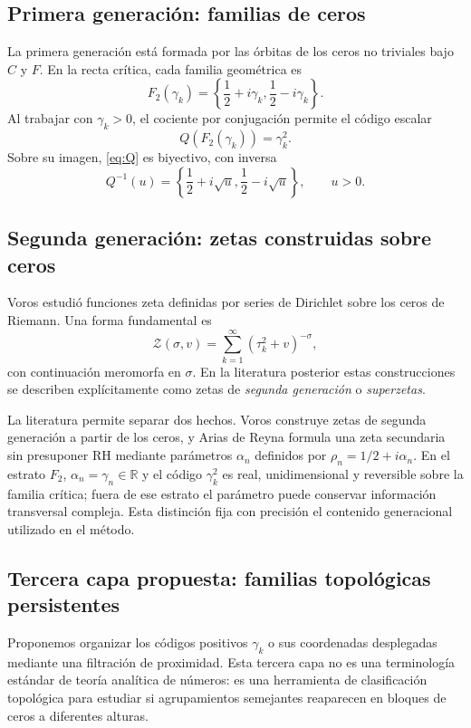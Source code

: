 \documentclass[11pt]{amsart}
\theoremstyle{definition}
\theoremstyle{remark}
\begin{document}
\subsection{Primera generación: familias de ceros}
La primera generación está formada por las órbitas de los ceros no triviales bajo $C$ y $F$. En la recta crítica, cada familia geométrica es
\begin{equation}
  F_2(\gamma_k)=\left\{\frac12+i\gamma_k,\frac12-i\gamma_k\right\}.
\end{equation}
Al trabajar con $\gamma_k>0$, el cociente por conjugación permite el código escalar
\begin{equation}\label{eq:Q}
 Q(F_2(\gamma_k))=\gamma_k^2.
\end{equation}
Sobre su imagen, \eqref{eq:Q} es biyectivo, con inversa
\begin{equation}
 Q^{-1}(u)=\left\{\frac12+i\sqrt u,\frac12-i\sqrt u\right\},\qquad u>0.
\end{equation}

\subsection{Segunda generación: zetas construidas sobre ceros}
Voros estudió funciones zeta definidas por series de Dirichlet sobre los ceros de Riemann. Una forma fundamental es
\begin{equation}\label{eq:superzeta}
 \mathcal Z(\sigma,v)=\sum_{k=1}^{\infty}(\tau_k^2+v)^{-\sigma},
\end{equation}
con continuación meromorfa en $\sigma$. En la literatura posterior estas construcciones se describen explícitamente como zetas de \emph{segunda generación} o \emph{superzetas}.

La literatura permite separar dos hechos. Voros construye zetas de segunda generación a partir de los ceros, y Arias de Reyna formula una zeta secundaria sin presuponer RH mediante parámetros $\alpha_n$ definidos por $\rho_n=1/2+i\alpha_n$. En el estrato $F_2$, $\alpha_n=\gamma_n\in\mathbb R$ y el código $\gamma_k^2$ es real, unidimensional y reversible sobre la familia crítica; fuera de ese estrato el parámetro puede conservar información transversal compleja. Esta distinción fija con precisión el contenido generacional utilizado en el método.

\subsection{Tercera capa propuesta: familias topológicas persistentes}
Proponemos organizar los códigos positivos $\gamma_k$ o sus coordenadas desplegadas mediante una filtración de proximidad. Esta tercera capa no es una terminología estándar de teoría analítica de números: es una herramienta de clasificación topológica para estudiar si agrupamientos semejantes reaparecen en bloques de ceros a diferentes alturas.
\end{document}

